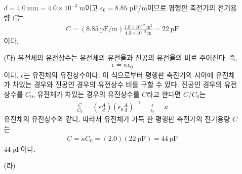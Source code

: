 \documentclass[tightenlines,floatfix,nofootinbib,superscriptaddress,fleqn]{revtex4-2}
\begin{document}
\begin{itemize}
  $d = 4.0~\mathrm{mm}=4.0 \times 10^{-3}~\mathrm{m}$이고 $\epsilon_0=8.85$ pF/m이므로
  평행판 축전기의 전기용량 $C$는
  \begin{align}
    C = (8.85~\mathrm{pF/m})\frac{1.0\times 10^{-2}~\mathrm{m^2}}
    {4.0 \times 10^{-3}~\mathrm{m}}
    =22~\mathrm{pF}
  \end{align}
  이다.
  \item[(다)] 유전체의 유전상수는 유전체의 유전율과 진공의 유전율의 비로 주어진다. 즉,
  \begin{align}
    \epsilon = \kappa\epsilon_0
  \end{align}
  이다. $\epsilon$는 유전체의 유전상수이다. 이 식으로부터 평행판 축전기의 사이에 유전체가
  차있는 경우와 진공인 경우의 유전상수 비를 구할 수 있다. 진공인 경우의 유전상수를 $C_0$,
  유전체가 차있는 경우의 유전상수를 $C$라고 한다면 $C/C_0$는
  \begin{align}
    \frac{C}{C_0}=\left(\epsilon\frac{A}{d}\right)
    \left(\epsilon_0\frac{A}{d}\right)^{-1}
    =\frac{\epsilon}{\epsilon_0}=\kappa
  \end{align}
  유전체의 유전상수와 같다. 따라서 유전체가 가득 찬 평행판 축전기의 전기용량 $C$는
  \begin{align}
    C = \kappa C_0 = (2.0)(22~\mathrm{pF})=44~\mathrm{pF}
  \end{align}
  $44~\mathrm{pF}$이다.
  \item[(라)]
   

\end{itemize}



\vspace{1.cm}
\end{document}
